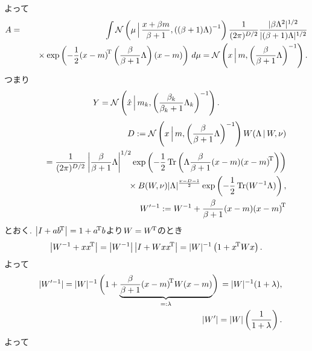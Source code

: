 よって
\begin{eqnarray*}
A
 &=& \int {\cal N}\left(\mu\,\Big|\,\frac{x+\beta m}{\beta + 1}, \left((\beta+1)\Lambda\right)^{-1}\right)\frac{1}{(2\pi)^{D/2}}
      \frac{|\beta \Lambda^2|^{1/2}}{|(\beta+1)\Lambda|^{1/2}}\\
 &&\phantom{\int}
   \times \exp\left(-\frac{1}{2} {(x-m)}^{\!\mathrm{T}} \left(\frac{\beta}{\beta+1}\Lambda\right) {(x-m)}\right)\,d\mu
  = {\cal N}\left(x\,\Big|\,m,\left(\frac{\beta}{\beta+1}\Lambda\right)^{-1}\right).
\end{eqnarray*}
つまり
$$
Y = {\cal N}\left(\hat{x}\,\Big|\,m_k,\left(\frac{\beta_k}{\beta_k+1}\Lambda_k\right)^{-1}\right).
$$
\begin{eqnarray*}
&&D
 := \calN\left(x\,\Big|\,m,\left(\frac{\beta}{\beta+1}\Lambda\right)^{-1}\right)W(\Lambda\,|\,W,\nu)\\
&&\phantom{D{:}}=
  \frac{1}{(2\pi)^{D/2}}\left|\frac{\beta}{\beta+1}\Lambda\right|^{1/2}
  \exp\left(-\half \tr\left(\Lambda \frac{\beta}{\beta+1}\outp{(x-m)}\right)\right)\\
&&\phantom{D:={}}
    \times B(W,\nu)|\Lambda|^{\frac{\nu-D-1}{2}}\exp\left(-\half \tr(W^{-1}\Lambda)\right),
\\
&&W'^{-1}
 := W^{-1}+\frac{\beta}{\beta+1}\outp{(x-m)}
\end{eqnarray*}
とおく.
$\left|I+a{b}^{\!\mathrm{T}}\right|=1+{a}^{\!\mathrm{T}}b$より$W={W}^{\!\mathrm{T}}$のとき
$$
\left|W^{-1}+x{x}^{\!\mathrm{T}}\right|=\left|W^{-1}\right|\left|I+Wx{x}^{\!\mathrm{T}}\right|=|W|^{-1}\left(1+{x}^{\!\mathrm{T}} W {x}\right).
$$
よって
\begin{eqnarray*}&&
|W'^{-1}|
=|W|^{-1}
  \left(1+\smash{\underbrace{\frac{\beta}{\beta+1}\quads{W}{(x-m)}}_{=:\lambda}}
  \vphantom{\frac\beta\beta}
  \right)
  \vphantom{\underbrace{\frac\beta\beta}_{\lambda}}
=|W|^{-1}(1+\lambda),
\\&&
|W'|=|W|\left(\frac{1}{1+\lambda}\right).
\end{eqnarray*}
よって

